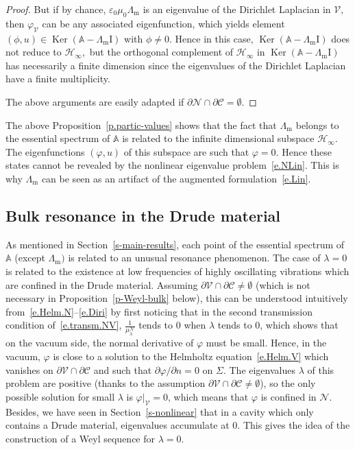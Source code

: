 \documentclass[AHL,Unicode,longabstracts]{cedram}
\DeclareMathOperator{\Ker}{Ker}
\newcommand{\epsl}{\varepsilon}
\newcommand{\calC}{\mathcal{C}}
\newcommand{\calH}{\mathcal{H}}
\newcommand{\calN}{\mathcal{N}}
\newcommand{\calV}{\mathcal{V}}
\newcommand{\bbA}{\mathbb{A}}
\newcommand{\Ident}{{\mathrm{I}}}
\newcommand{\Lm}{{\Lambda_{\mathrm{m}}}}
\begin{document}
\begin{proof}
But if by chance, $\epsl_0 \mu_0 \Lm$ is an eigenvalue of the Dirichlet Laplacian in $\calV,$ then $\varphi_\calV$ can be any associated eigenfunction, which yields element $(\phi,u) \in \Ker(\bbA - \Lm\Ident)$ with $\phi \neq 0.$ Hence in this case, $\Ker(\bbA - \Lm\Ident)$ does not reduce to $\calH_\infty,$ but the orthogonal complement of $\calH_\infty$ in $\Ker(\bbA - \Lm\Ident)$ has necessarily a finite dimension since the eigenvalues of the Dirichlet Laplacian have a finite multiplicity.

The above arguments are easily adapted if $\partial\calN \cap \partial\calC = \emptyset.$
\end{proof}

\begin{rema}\label{r-artifact}
The above Proposition~\ref{p.partic-values} shows that the fact that $\Lm$ belongs to the essential spectrum of $\bbA$ is related to the infinite dimensional subspace $\calH_\infty.$ The eigenfunctions $(\varphi,u)$ of this subspace are such that $\varphi = 0.$ Hence these states cannot be revealed by the nonlinear eigenvalue problem~\eqref{e.NLin}. This is why $\Lm$ can be seen as an artifact of the augmented formulation~\eqref{e.Lin}.
\end{rema}


\subsection{Bulk resonance in the Drude material}\label{s-bulk-reson}

As mentioned in Section~\ref{s-main-results}, each point of the essential spectrum of $\bbA$ (except $\Lm)$ is related to an unusual resonance phenomenon. The case of $\lambda = 0$ is related to the existence at low frequencies of highly oscillating vibrations which are confined in the Drude material. Assuming $\partial\calV \cap \partial\calC \neq \emptyset$ (which is not necessary in Proposition~\ref{p-Weyl-bulk} below), this can be understood intuitively from~\eqref{e.Helm.N}--\eqref{e.Diri} by first noticing that in the second transmission condition of~\eqref{e.transm.NV}, $\frac{1}{\mu_\lambda^\calN}$ tends to $0$ when $\lambda$ tends to $0$, which shows that on the vacuum side, the normal derivative of $\varphi$ must be small. Hence, in the vacuum, $\varphi$ is close to a solution to the Helmholtz equation~\eqref{e.Helm.V} which vanishes on $\partial\calV \cap \partial\calC$ and such that $\partial\varphi/\partial n = 0$ on $\Sigma.$ The eigenvalues $\lambda$ of this problem are positive (thanks to the assumption $\partial\calV \cap \partial\calC \neq \emptyset$), so the only possible solution for small $\lambda$ is $\varphi|_\calV = 0$, which means that $\varphi$ is confined in $\calN.$ Besides, we have seen in Section~\ref{s-nonlinear} that in a cavity which only contains a Drude material, eigenvalues accumulate at 0. This gives the idea of the construction of a Weyl sequence for $\lambda = 0.$
\end{document}
